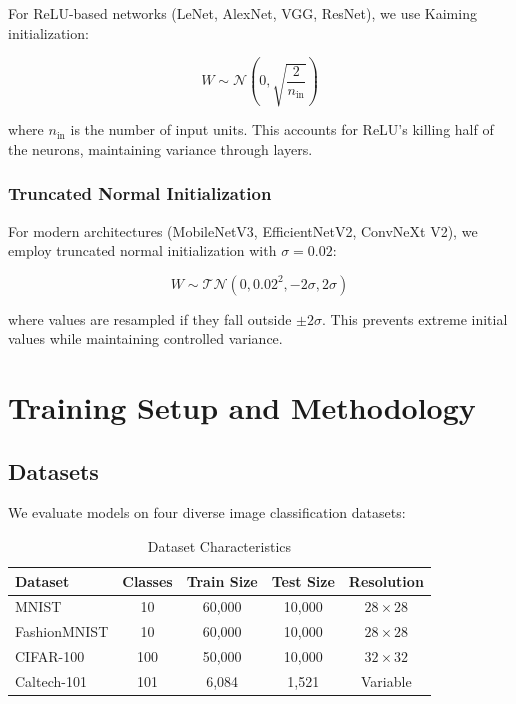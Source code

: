 For ReLU-based networks (LeNet, AlexNet, VGG, ResNet), we use Kaiming initialization:

\begin{equation}
W \sim \mathcal{N}\left(0, \sqrt{\frac{2}{n_{\text{in}}}}\right)
\end{equation}

where $n_{\text{in}}$ is the number of input units. This accounts for ReLU's killing half of the neurons, maintaining variance through layers.

\subsubsection{Truncated Normal Initialization}

For modern architectures (MobileNetV3, EfficientNetV2, ConvNeXt V2), we employ truncated normal initialization with $\sigma = 0.02$:

\begin{equation}
W \sim \mathcal{TN}(0, 0.02^2, -2\sigma, 2\sigma)
\end{equation}

where values are resampled if they fall outside $\pm 2\sigma$. This prevents extreme initial values while maintaining controlled variance.

\section{Training Setup and Methodology}

\subsection{Datasets}

We evaluate models on four diverse image classification datasets:

\begin{table}[h]
\centering
\caption{Dataset Characteristics}
\begin{tabular}{lcccc}
\hline
\textbf{Dataset} & \textbf{Classes} & \textbf{Train Size} & \textbf{Test Size} & \textbf{Resolution} \\
\hline
MNIST & 10 & 60,000 & 10,000 & $28 \times 28$ \\
FashionMNIST & 10 & 60,000 & 10,000 & $28 \times 28$ \\
CIFAR-100 & 100 & 50,000 & 10,000 & $32 \times 32$ \\
Caltech-101 & 101 & 6,084 & 1,521 & Variable \\
\hline
\end{tabular}
\end{table}

